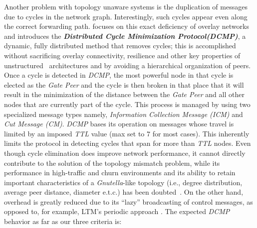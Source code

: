 Another problem with topology unaware
systems is the duplication of messages due to cycles in the network graph.
Interestingly, such cycles appear even along the correct forwarding path.
\cite{ZKB2008} focuses on this exact deficiency of overlay networks and
introduces the \textbf{\emph{Distributed Cycle Minimization Protocol(DCMP)}},
a dynamic, fully distributed method that removes cycles;
this is accomplished without sacrificing
overlay connectivity, resilience and other key properties of unstructured
\p\ architectures and by avoiding a hierarchical organization of peers. 
Once a cycle is detected in {\it DCMP}, the most powerful node in that cycle 
is elected as the \emph{Gate Peer} and the cycle is then broken in that place
that it will result in the minimization of the distance between the
\emph{Gate Peer} and all other nodes that are currently part of the cycle. 
This process is managed by using two specialized message types 
namely, \emph{Information Collection Message (ICM)} and \emph{Cut Message (CM)}. 
\emph{DCMP} bases its operation on messages whose travel is limited by an
imposed \emph{TTL} value (max set to $7$ for most cases). This inherently limits
the protocol in detecting cycles that span for more than \emph{TTL} nodes.
Even though cycle elimination does improve network performance, 
it cannot  directly contribute to the solution of the topology mismatch
problem, while its performance in high-traffic and churn environments and its
ability to retain important characteristics of a \emph{Gnutella}-like topology (i.e.,
degree distribution, average peer distance, diameter e.t.c.) has been
doubted~\cite{CSG2010}. 
On the other hand, overhead is greatly reduced 
due to its ``lazy'' broadcasting of control messages, as opposed to, for example,
LTM's periodic approach \cite{ZKB2008}.
%
%
The expected \emph{DCMP} behavior as far as our three criteria is:
